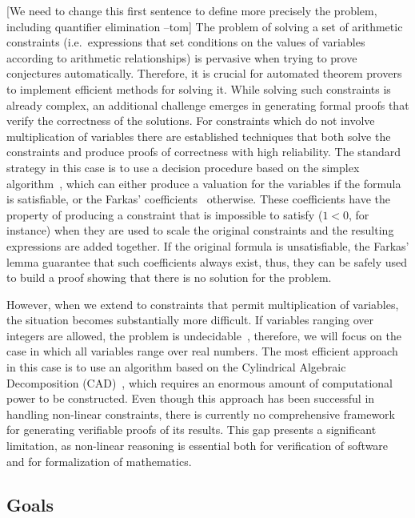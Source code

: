 \documentclass[a4paper, 12pt]{article}
\newcommand{\yell}[1]{{\color{blue} [#1]}}
\newcommand{\tom}[1]{\yell{#1 --tom}}
\begin{document}
\tom{We need to change this first sentence to define more precisely the problem, including quantifier elimination}
The problem of solving a set of arithmetic constraints (i.e.\ expressions that set conditions
on the values of variables according to arithmetic relationships) is pervasive when trying to
prove conjectures automatically. Therefore, it is crucial for automated theorem provers to
implement efficient methods for solving it.
%
While solving such constraints is already complex, an additional challenge emerges in generating
formal proofs that verify the correctness of the solutions.
%
For constraints which do not involve multiplication of variables there are established techniques
that both solve the constraints and produce proofs of correctness with high reliability.
%
The standard strategy in this case is to use a decision procedure based on the simplex algorithm~\cite{simplex_dpllt}, which can either produce a valuation for the variables if the formula
is satisfiable, or the Farkas' coefficients~\cite{farkas_ref} otherwise.
%
These coefficients have the property of producing a constraint that is impossible to satisfy
($1 < 0$, for instance) when they are used to scale the original constraints and the resulting
expressions are added together.
%
If the original formula is unsatisfiable, the Farkas' lemma guarantee that such coefficients always
exist, thus, they can be safely used to build a proof showing that there is no solution for the problem.

However, when we extend to constraints that permit multiplication of variables,
the situation becomes substantially more difficult.
If variables ranging over integers are allowed, the problem is undecidable~\cite{integerUndec},
therefore, we will focus on the case in which all variables range over real numbers.
The most efficient approach in this case
is to use an algorithm based on the Cylindrical Algebraic Decomposition (CAD)~\cite{col75},
which requires an enormous amount of computational power to be constructed. Even though
this approach has been successful in handling non-linear constraints, there is currently
no comprehensive framework for generating verifiable proofs of its results. This gap presents
a significant limitation, as non-linear reasoning is essential both for verification of
software and for formalization of mathematics.

\subsection{Goals}
\end{document}
